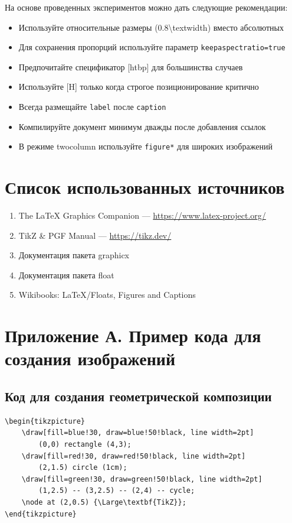 \documentclass[12pt,a4paper]{article}
\begin{document}
На основе проведенных экспериментов можно дать следующие рекомендации:

\begin{itemize}
    \item Используйте относительные размеры (0.8\textbackslash textwidth) вместо абсолютных
    \item Для сохранения пропорций используйте параметр \texttt{keepaspectratio=true}
    \item Предпочитайте спецификатор [htbp] для большинства случаев
    \item Используйте [H] только когда строгое позиционирование критично
    \item Всегда размещайте \texttt{label} после \texttt{caption}
    \item Компилируйте документ минимум дважды после добавления ссылок
    \item В режиме twocolumn используйте \texttt{figure*} для широких изображений
\end{itemize}

\section{Список использованных источников}

\begin{enumerate}
    \item The LaTeX Graphics Companion — \url{https://www.latex-project.org/}
    \item TikZ \& PGF Manual — \url{https://tikz.dev/}
    \item Документация пакета graphicx
    \item Документация пакета float
    \item Wikibooks: LaTeX/Floats, Figures and Captions
\end{enumerate}

\newpage

\section*{Приложение А. Пример кода для создания изображений}

\subsection*{Код для создания геометрической композиции}

\begin{verbatim}
\begin{tikzpicture}
    \draw[fill=blue!30, draw=blue!50!black, line width=2pt] 
        (0,0) rectangle (4,3);
    \draw[fill=red!30, draw=red!50!black, line width=2pt] 
        (2,1.5) circle (1cm);
    \draw[fill=green!30, draw=green!50!black, line width=2pt] 
        (1,2.5) -- (3,2.5) -- (2,4) -- cycle;
    \node at (2,0.5) {\Large\textbf{TikZ}};
\end{tikzpicture}
\end{verbatim}
\end{document}

